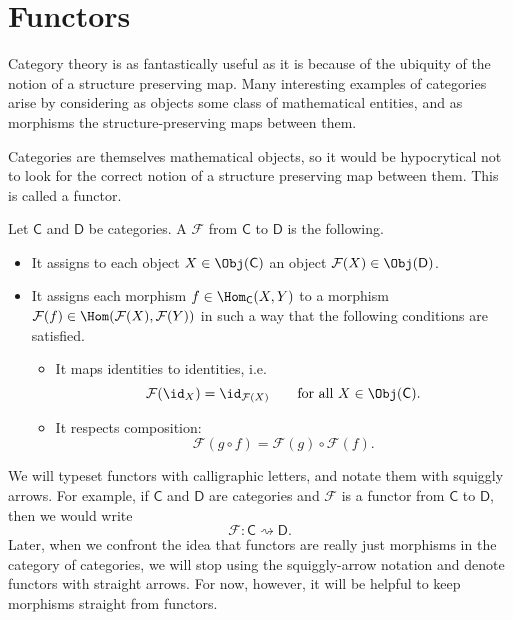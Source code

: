 \documentclass[main.tex]{subfiles}
\begin{document}
\section{Functors}\label{sec:functors}

Category theory is as fantastically useful as it is because of the ubiquity of the notion of a structure preserving map. Many interesting examples of categories arise by considering as objects some class of mathematical entities, and as morphisms the structure-preserving maps between them.

Categories are themselves mathematical objects, so it would be hypocrytical not to look for the correct notion of a structure preserving map between them. This is called a functor.

\begin{definition}[functor]
  \label{def:functor}
  Let $\mathsf{C}$ and $\mathsf{D}$ be categories. A  $\mathcal{F}$ from $\mathsf{C}$ to $\mathsf{D}$ is the following.
  \begin{itemize}
    \item It assigns to each object $X \in \Obj(\mathsf{C})$ an object $\mathcal{F}(X) \in \Obj(\mathsf{D})$.

    \item It assigns each morphism $f \in \Hom_{\mathsf{C}}(X, Y)$ to a morphism $\mathcal{F}(f) \in \Hom(\mathcal{F}(X), \mathcal{F}(Y))$ in such a way that the following conditions are satisfied.
      \begin{itemize}
        \item It maps identities to identities, i.e.\
          \begin{equation*}
            \mathcal{F}(\id_{X}) = \id_{\mathcal{F}(X)}\qquad \text{for all } X \in \Obj(\mathsf{C}).
          \end{equation*}
        \item It respects composition:
          \begin{equation*}
            \mathcal{F}(g \circ f) = \mathcal{F}(g) \circ \mathcal{F}(f).
          \end{equation*}
      \end{itemize}
  \end{itemize}
\end{definition}

\begin{notation}
  We will typeset functors with calligraphic letters, and notate them with squiggly arrows. For example, if $\mathsf{C}$ and $\mathsf{D}$ are categories and $\mathcal{F}$ is a functor from $\mathsf{C}$ to $\mathsf{D}$, then we would write
  \begin{equation*}
    \mathcal{F}\colon \mathsf{C} \rightsquigarrow \mathsf{D}.
  \end{equation*}
  Later, when we confront the idea that functors are really just morphisms in the category of categories, we will stop using the squiggly-arrow notation and denote functors with straight arrows. For now, however, it will be helpful to keep morphisms straight from functors.
\end{notation}
\end{document}
